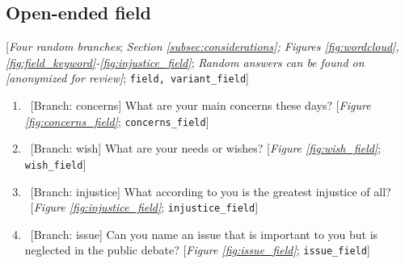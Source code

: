 \begin{enumerate}[resume]


\end{enumerate} 

 \subsection*{Open-ended field} 
 [\textit{Four random branches}; \textit{Section \ref{subsec:considerations}; Figures \ref{fig:wordcloud}, \ref{fig:field_keyword}-\ref{fig:injustice_field}}; \textit{Random answers can be found on [anonymized for review]}; %
 \verb|field, variant_field|] 
 \begin{enumerate}[resume] 
\item  \label{q:concerns_field} ~[Branch: concerns] What are your main concerns these days? [\textit{Figure \ref{fig:concerns_field}}; 
\verb|concerns_field|]


\item  \label{q:wish_field} ~[Branch: wish] What are your needs or wishes? [\textit{Figure \ref{fig:wish_field}}; 
\verb|wish_field|]


\item  \label{q:injustice_field} ~[Branch: injustice] What according to you is the greatest injustice of all?\\ 
~[\textit{Figure \ref{fig:injustice_field}}; 
\verb|injustice_field|]


\item  \label{q:issue_field} ~[Branch: issue] Can you name an issue that is important to you but is neglected in the public debate? [\textit{Figure \ref{fig:issue_field}}; 
\verb|issue_field|]


\end{enumerate} 

